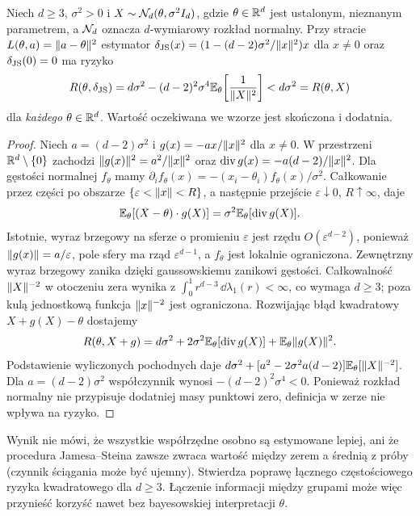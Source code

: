 \begin{twierdzenie}
\label{thm:james-stein}
Niech $d\ge3$, $\sigma^2>0$ i
$X\sim\mathcal N_d(\theta,\sigma^2 I_d)$, gdzie
$\theta\in\mathbb R^d$ jest ustalonym, nieznanym parametrem,
a $\mathcal N_d$ oznacza $d$-wymiarowy rozkład normalny.
Przy stracie $L(\theta,a)=\lVert a-\theta\rVert^2$ estymator
$\delta_{\rm JS}(x)=(1-(d-2)\sigma^2/\lVert x\rVert^2)x$
dla $x\ne0$ oraz $\delta_{\rm JS}(0)=0$ ma ryzyko
\[
 R(\theta,\delta_{\rm JS})
 =d\sigma^2-(d-2)^2\sigma^4
   \mathbb E_\theta\!\left[\frac1{\lVert X\rVert^2}\right]
 <d\sigma^2=R(\theta,X)
\]
dla \emph{każdego} $\theta\in\mathbb R^d$.
Wartość oczekiwana we wzorze jest skończona i dodatnia.
\end{twierdzenie}
\begin{proof}
Niech $a=(d-2)\sigma^2$ i
$g(x)=-ax/\lVert x\rVert^2$ dla $x\ne0$.
W przestrzeni $\mathbb R^d\setminus\{0\}$ zachodzi
$\lVert g(x)\rVert^2=a^2/\lVert x\rVert^2$ oraz
$\operatorname{div}g(x)=-a(d-2)/\lVert x\rVert^2$.
Dla gęstości normalnej $f_\theta$ mamy
$\partial_i f_\theta(x)=-(x_i-\theta_i)f_\theta(x)/\sigma^2$.
Całkowanie przez części po obszarze
$\{\varepsilon<\lVert x\rVert<R\}$, a następnie przejście
$\varepsilon\downarrow0$, $R\uparrow\infty$, daje
\[
 \mathbb E_\theta[(X-\theta)\cdot g(X)]
   =\sigma^2\mathbb E_\theta[\operatorname{div}g(X)].
\]
Istotnie, wyraz brzegowy na sferze o promieniu
$\varepsilon$ jest rzędu $O(\varepsilon^{d-2})$,
ponieważ $\lVert g(x)\rVert=a/\varepsilon$, pole sfery ma
rząd $\varepsilon^{d-1}$, a $f_\theta$ jest lokalnie
ograniczona. Zewnętrzny wyraz brzegowy zanika dzięki
gaussowskiemu zanikowi gęstości.
Całkowalność $\lVert X\rVert^{-2}$ w otoczeniu zera
wynika z $\int_0^1r^{d-3}\,\dd\lambda_1(r)<\infty$,
co wymaga $d\ge3$; poza kulą jednostkową funkcja
$\lVert x\rVert^{-2}$ jest ograniczona.
Rozwijając błąd kwadratowy $X+g(X)-\theta$ dostajemy
\[
 R(\theta,X+g)=d\sigma^2
   +2\sigma^2\mathbb E_\theta[\operatorname{div}g(X)]
   +\mathbb E_\theta\lVert g(X)\rVert^2.
\]
Podstawienie wyliczonych pochodnych daje
$d\sigma^2+[a^2-2\sigma^2a(d-2)]\mathbb E_\theta[\lVert X\rVert^{-2}]$.
Dla $a=(d-2)\sigma^2$ współczynnik wynosi
$-(d-2)^2\sigma^4<0$. Ponieważ rozkład normalny nie
przypisuje dodatniej masy punktowi zero, definicja w zerze
nie wpływa na ryzyko.
\end{proof}

\begin{uwaga}
Wynik nie mówi, że wszystkie współrzędne osobno są
estymowane lepiej, ani że procedura Jamesa--Steina zawsze
zwraca wartość między zerem a średnią z próby (czynnik
ściągania może być ujemny). Stwierdza poprawę łącznego
częstościowego ryzyka kwadratowego dla $d\ge3$.
Łączenie informacji między grupami może więc przynieść
korzyść nawet bez bayesowskiej interpretacji $\theta$.
\end{uwaga}

